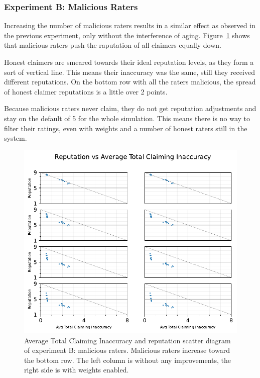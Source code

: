 \documentclass[%
    ]{\PathToTumTemplate/thesis/tum_thesis}
\begin{document}
\subsubsection{Experiment B: Malicious Raters}

Increasing the number of malicious raters results in a similar effect as observed in the previous experiment, only without the interference of aging.
Figure~\ref{fig:res_b_scatter} shows that malicious raters push the raputation of all claimers equally down.

Honest claimers are smeared towards their ideal reputation levels, as they form a sort of vertical line.
This means their inaccuracy was the same, still they received different reputations.
On the bottom row with all the raters malicious, the spread of honest claimer reputations is a little over 2 points.

Because malicious raters never claim, they do not get reputation adjustments and stay on the default of 5 for the whole simulation.
This means there is no way to filter their ratings, even with weights and a number of honest raters still in the system.

\begin{figure}[tbp]
  \begin{center}
        \includegraphics[width=0.75\linewidth]	{../results/b/AvgTotClaimInaccuracyAndReputationScatter_joined.pdf}
    \caption{
    Average Total Claiming Inaccuracy and reputation scatter diagram of experiment B: malicious raters.
    Malicious raters increase toward the bottom row.
    The left column is without any improvements, the right side is with weights enabled.
    }
    \label{fig:res_b_scatter}
  \end{center}
\end{figure}
\end{document}
